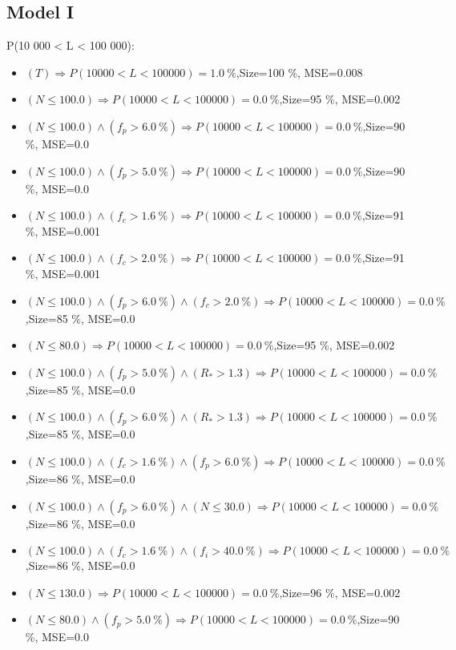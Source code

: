 \documentclass[numbered]{CSL}
\begin{document}
\subsection{Model I}
P(10 000 < L < 100 000):
\begin{itemize}
\item $(T) \Rightarrow P(10 000 < L < 100 000) = 1.0~\%$,\hfill Size=100 \%, MSE=0.008
\item $(N \leq 100.0) \Rightarrow P(10 000 < L < 100 000) = 0.0~\%$,\hfill Size=95 \%, MSE=0.002
\item $(N \leq 100.0) \land (f_p > 6.0~\%) \Rightarrow P(10 000 < L < 100 000) = 0.0~\%$,\hfill Size=90 \%, MSE=0.0
\item $(N \leq 100.0) \land (f_p > 5.0~\%) \Rightarrow P(10 000 < L < 100 000) = 0.0~\%$,\hfill Size=90 \%, MSE=0.0
\item $(N \leq 100.0) \land (f_c > 1.6~\%) \Rightarrow P(10 000 < L < 100 000) = 0.0~\%$,\hfill Size=91 \%, MSE=0.001
\item $(N \leq 100.0) \land (f_c > 2.0~\%) \Rightarrow P(10 000 < L < 100 000) = 0.0~\%$,\hfill Size=91 \%, MSE=0.001
\item $(N \leq 100.0) \land (f_p > 6.0~\%) \land (f_c > 2.0~\%) \Rightarrow P(10 000 < L < 100 000) = 0.0~\%$,\hfill Size=85 \%, MSE=0.0
\item $(N \leq 80.0) \Rightarrow P(10 000 < L < 100 000) = 0.0~\%$,\hfill Size=95 \%, MSE=0.002
\item $(N \leq 100.0) \land (f_p > 5.0~\%) \land (R_* > 1.3) \Rightarrow P(10 000 < L < 100 000) = 0.0~\%$,\hfill Size=85 \%, MSE=0.0
\item $(N \leq 100.0) \land (f_p > 6.0~\%) \land (R_* > 1.3) \Rightarrow P(10 000 < L < 100 000) = 0.0~\%$,\hfill Size=85 \%, MSE=0.0
\item $(N \leq 100.0) \land (f_c > 1.6~\%) \land (f_p > 6.0~\%) \Rightarrow P(10 000 < L < 100 000) = 0.0~\%$,\hfill Size=86 \%, MSE=0.0
\item $(N \leq 100.0) \land (f_p > 6.0~\%) \land (N \leq 30.0) \Rightarrow P(10 000 < L < 100 000) = 0.0~\%$,\hfill Size=86 \%, MSE=0.0
\item $(N \leq 100.0) \land (f_c > 1.6~\%) \land (f_i > 40.0~\%) \Rightarrow P(10 000 < L < 100 000) = 0.0~\%$,\hfill Size=86 \%, MSE=0.0
\item $(N \leq 130.0) \Rightarrow P(10 000 < L < 100 000) = 0.0~\%$,\hfill Size=96 \%, MSE=0.002
\item $(N \leq 80.0) \land (f_p > 5.0~\%) \Rightarrow P(10 000 < L < 100 000) = 0.0~\%$,\hfill Size=90 \%, MSE=0.0

\end{itemize}
\end{document}
